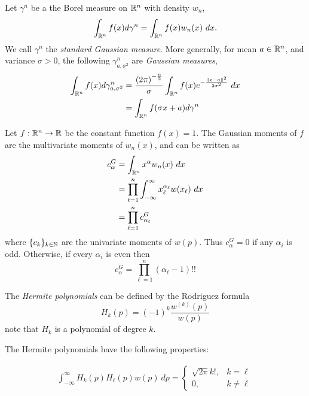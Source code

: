\begin{definition}
Let $\gamma^n$ be a the Borel measure on $\mathbb{R}^n$ with density $w_n$,
\[
  \int_{\mathbb{R}^n} f(x) d\gamma^n = \int_{\mathbb{R}^n} f(x) w_n(x) ~dx.
\]
We call $\gamma^n$ the \textit{standard Gaussian measure}. 
More generally, for mean $a \in \mathbb{R}^n$, and variance $\sigma > 0$, the following $\gamma^{n}_{a, \sigma^2}$ are \textit{Gaussian measures},
\begin{align*}
  \int_{\mathbb{R}^n} f(x) d\gamma^n_{a,\sigma^2}
  &= \frac{{(2\pi)}^{-\frac n2}}{\sigma}  \int_{\mathbb{R}^n} f(x) e^{-\frac{\|x - a\|^2}{2\sigma^2}} ~dx \\
  &= \int_{\mathbb{R}^n} f(\sigma x + a) d\gamma^n
\end{align*}
\end{definition}

\begin{myexample}
  Let $f:\mathbb{R}^n \rightarrow \mathbb{R}$ be the constant function $f(x)=1$. The Gaussian moments of $f$ are the multivariate moments of $w_n(x)$, and can be written as
  \begin{align*}
    c^G_\alpha 
    &= \int_{\mathbb{R}^n} x^\alpha w_n(x) ~dx \\
    &= \prod_{\ell = 1}^n \int_{-\infty}^\infty x_\ell^{\alpha_\ell} w(x_\ell) ~dx \\
    &= \prod_{\ell = 1}^n c^G_{\alpha_\ell}
  \end{align*}
  where $\{c_k\}_{k \in \mathbb{N}}$ are the univariate moments of $w(p)$.
  Thus $c^G_\alpha = 0$ if any $\alpha_i$ is odd. Otherwise, if every $\alpha_i$ is even then
  \[
    c^G_\alpha = \prod_{\ell = 1}^n (\alpha_\ell - 1)!!
  \]
\end{myexample}

\begin{definition}
  The \textit{Hermite polynomials} can be defined by the Rodriguez formula
  \[
      H_k(p) = {(-1)}^k \frac{w^{(k)}(p)}{w(p)}
  \]
  note that $H_k$ is a polynomial of degree $k$.
\end{definition}
The Hermite polynomials have the following properties:

\begin{align*}
  \int_{-\infty}^\infty H_k(p) H_\ell(p) w(p)~dp 
  = \begin{cases}
    \sqrt{2\pi} k!, & k = \ell \\
    0, & k \neq \ell
  \end{cases}
\end{align*}

